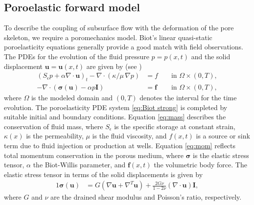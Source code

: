 \documentclass[11pt,final]{article}%
\newcommand{\I}{\boldsymbol{I}}
\newcommand{\Stor}{S_{\epsilon}}
\renewcommand{\u}{\ensuremath{\boldsymbol{u}}}
\newcommand{\s}{\boldsymbol\sigma}
\newcommand{\f}{\ensuremath{\boldsymbol{f}}}
\renewcommand{\citet}{\cite}
\begin{document}
\subsection{Poroelastic forward model}\label{sec:poromech}

To describe the coupling of subsurface flow with the deformation of the pore skeleton, we require a poromechanics model. Biot's linear quasi-static poroelasticity equations  \citet{Biot1941}
generally provide a good match with field observations. The PDEs for the evolution of the fluid pressure $p=p(x,t)$ and the solid displacement $\u=\u(x,t)$ are given by (see \citet{Wang2000})
\begin{subequations}\label{eq:Biot strong}
\begin{alignat}{2}
\left(\Stor p+\alpha\nabla\cdot\u\right)_t-\nabla\cdot\left(\kappa/\mu\, \nabla p\right)&=f &&  \text{ in }\Omega\times (0,T), \label{eq:mass}\\
 -\nabla\cdot\left(\s(\u) -\alpha p\I\right)&=\f && \text{ in }\Omega\times (0,T), \label{eq:mom}
\end{alignat}
\end{subequations}
where $\Omega$ is the modeled domain and $(0,T)$ denotes the interval for the time evolution.  The poroelasticity PDE system \eqref{eq:Biot strong} is completed by suitable initial and boundary
conditions.  Equation \eqref{eq:mass} describes the conservation of fluid mass, where $\Stor$ is the specific storage at constant strain, $\kappa(x)$ is the permeability, $\mu$ is the fluid viscosity, and
$f(x,t)$ is a source or sink term due to fluid injection or production at wells.  Equation \eqref{eq:mom} reflects total momentum conservation in the porous medium, where $\s$ is the elastic stress
tensor, $\alpha$ the Biot-Willis parameter, and $\f(x,t)$ the volumetric body force.  The elastic stress
tensor in terms of the solid displacements is given by
\begin{alignat*}{1}
 \s(\u)&=G\left(\nabla\u+\nabla^{T}\u\right)+\frac{2G\nu}{1-2\nu}\left(\nabla\cdot\u\right)\I, %
\end{alignat*}
where $G$ and $\nu$ are the drained shear modulus and Poisson's ratio, respectively.  
\end{document}
